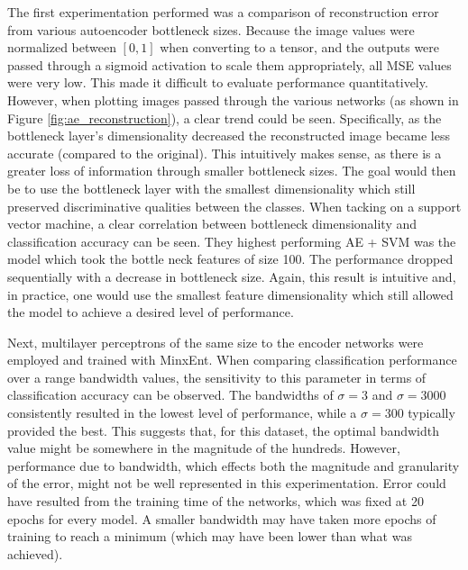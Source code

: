 \documentclass[conference]{IEEEtran}
\begin{document}
The first experimentation performed was a comparison of reconstruction error from various autoencoder bottleneck sizes.  Because the image values were normalized between $[0,1]$ when converting to a tensor, and the outputs were passed through a sigmoid activation to scale them appropriately, all MSE values were very low.  This  made it difficult to evaluate performance quantitatively.  However, when plotting images passed through the various networks (as shown in Figure \ref{fig:ae_reconstruction}), a clear trend could be seen.  Specifically, as the bottleneck layer's dimensionality decreased the reconstructed image became less accurate (compared to the original).  This intuitively makes sense, as there is a greater loss of information through smaller bottleneck sizes.  The goal would then be to use the bottleneck layer with the smallest dimensionality which still preserved discriminative qualities between the classes. When tacking on a support vector machine, a clear correlation between bottleneck dimensionality and classification accuracy can be seen.  They highest performing AE + SVM was the model which took the bottle neck features of size 100.  The performance dropped sequentially with a decrease in bottleneck size.  Again, this result is intuitive and, in practice, one would use the smallest feature dimensionality which still allowed the model to achieve a desired level of performance.

Next, multilayer perceptrons  of the same size to the encoder networks were employed and trained with MinxEnt.  When comparing classification performance over a range bandwidth values, the sensitivity to this parameter in terms of classification accuracy can be observed. The bandwidths of $\sigma=3$ and $\sigma=3000$ consistently resulted in the lowest  level of performance, while a $\sigma=300$ typically provided the best.  This suggests that, for this dataset, the optimal bandwidth value might be somewhere in the magnitude of the hundreds.  However, performance due to bandwidth, which effects both the magnitude and granularity of the error, might not be well represented in this experimentation.  Error could have resulted from the training time of the networks, which was fixed at 20 epochs for every model.  A smaller bandwidth may have taken more epochs of training to reach a minimum (which may have been lower than what was achieved).
\end{document}

